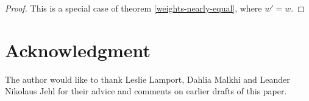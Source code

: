 \documentclass[journal]{IEEEtran}
\begin{document}
\begin{proof} This is a special case of theorem \ref{weights-nearly-equal},
where $w' = w$.  \end{proof}

\section*{Acknowledgment}

The author would like to thank Leslie Lamport, Dahlia Malkhi and Leander
Nikolaus Jehl for their advice and comments on earlier drafts of this paper.



\ifCLASSOPTIONcaptionsoff
  \newpage
\fi







%

% 
\end{document}
